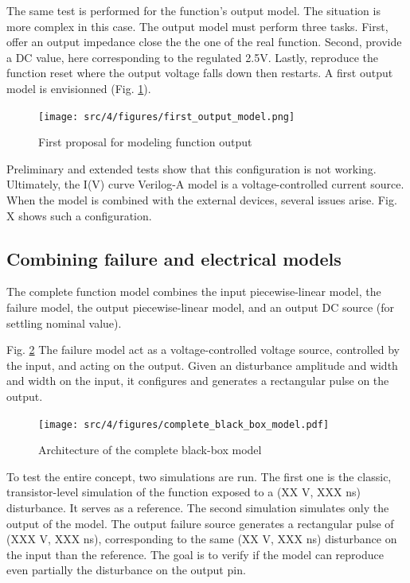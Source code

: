 The same test is performed for the function's output model.
The situation is more complex in this case.
The output model must perform three tasks.
First, offer an output impedance close the the one of the real function.
Second, provide a DC value, here corresponding to the regulated 2.5V.
Lastly, reproduce the function reset where the output voltage falls down then restarts.
A first output model is envisionned (Fig. \ref{fig:first-output-model}).

\begin{figure}[!h]
  \centering
  \texttt{[image: src/4/figures/first\_output\_model.png]}
  \caption{First proposal for modeling function output}
  \label{fig:first-output-model}
\end{figure}

Preliminary and extended tests show that this configuration is not working.
Ultimately, the I(V) curve Verilog-A model is a voltage-controlled current source.
When the model is combined with the external devices, several issues arise.
Fig. X shows such a configuration.

\subsection{Combining failure and electrical models}

The complete function model combines the input piecewise-linear model, the failure model, the output piecewise-linear model, and an output DC source (for settling nominal value).

Fig. \ref{fig:complete-black-box-model}
The failure model act as a voltage-controlled voltage source, controlled by the input, and acting on the output.
Given an disturbance amplitude and width and width on the input, it configures and generates a rectangular pulse on the output.

\begin{figure}[!h]
  \centering
  \texttt{[image: src/4/figures/complete\_black\_box\_model.pdf]}
  \caption{Architecture of the complete black-box model}
  \label{fig:complete-black-box-model}
\end{figure}

To test the entire concept, two simulations are run.
The first one is the classic, transistor-level simulation of the function exposed to a (XX V, XXX ns) disturbance.
It serves as a reference.
The second simulation simulates only the output of the model.
The output failure source generates a rectangular pulse of (XXX V, XXX ns), corresponding to the same (XX V, XXX ns) disturbance on the input than the reference.
The goal is to verify if the model can reproduce even partially the disturbance on the output pin.

